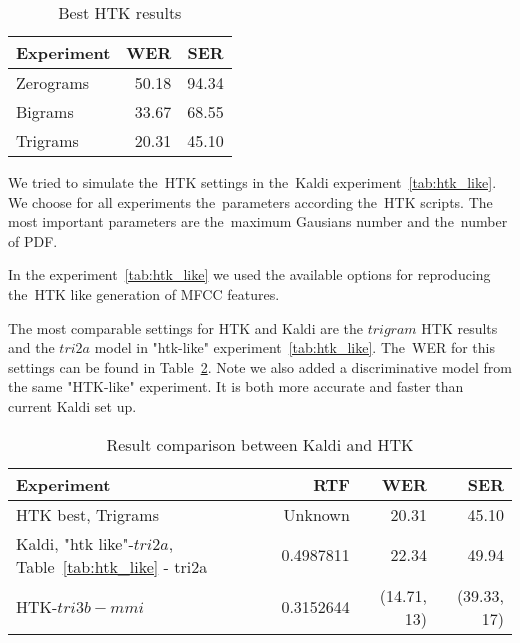 {\begin{table}[!htp]\label{tab:htk_res}\centering\begin{tabular}{l|rr}
Experiment      & \ac{WER} & \ac{SER} \\
\hline
    Zerograms      & 50.18  & 94.34  \\
    Bigrams        & 33.67  & 68.55  \\
    Trigrams       & 20.31  & 45.10  \\
\end{tabular}
\caption{Best \ac{HTK} results}
\end{table}  


We tried to simulate the~\ac{HTK} settings in the~Kaldi experiment~\ref{tab:htk_like}.
We choose for all experiments the~parameters according the~\ac{HTK} scripts.
The most important parameters are the~maximum Gausians number and the~number of \acl{PDF}.

In the experiment~\ref{tab:htk_like} we used the available options for reproducing the~\ac{HTK} like generation
of \ac{MFCC} features.

The most comparable settings for \ac{HTK} and Kaldi are the $trigram$ \ac{HTK} results
and the $tri2a$ model in "htk-like" experiment~\ref{tab:htk_like}. 
The~\ac{WER} for this settings can be found in Table~\ref{tab:compare}.
Note we also added a discriminative model from the same "\ac{HTK}-like" experiment.
It is both more accurate and faster than current Kaldi set up.

\begin{table}[!htp]\label{tab:compare}\centering\begin{tabular}{l|rrr}
    Experiment   & \ac{RTF} & \ac{WER} & \ac{SER} \\
\hline
\hline
\ac{HTK} best, Trigrams   & Unknown  & 20.31  & 45.10  \\
Kaldi, "htk like"-$tri2a$, Table~\ref{tab:htk_like} - tri2a & 0.4987811 & 22.34 & 49.94\\
\hline
\ac{HTK}-$tri3b-mmi$       & 0.3152644     & (14.71, 13) & (39.33, 17)\\ 
\end{tabular} \caption{Result comparison between Kaldi and \ac{HTK}} \end{table}  

}
